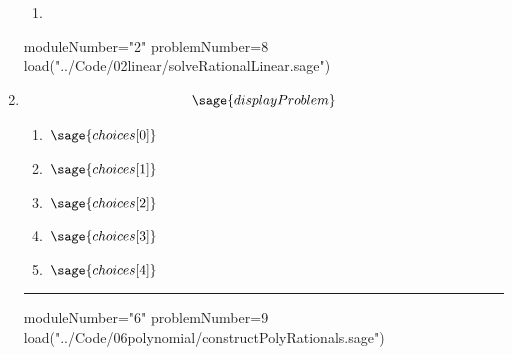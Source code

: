 \documentclass[14pt]{extbook}
\newcommand{\litem}[1]{\item#1\hspace*{-1cm}\rule{\textwidth}{0.4pt}}
\begin{document}
\begin{enumerate}
{\begin{enumerate}[label=\Alph*.]
        \item {}
\end{enumerate}
}
\begin{sagesilent}
moduleNumber="2"
problemNumber=8
load("../Code/02linear/solveRationalLinear.sage")
\end{sagesilent}

\litem{ 

   \[ \sage{displayProblem} \]

  	\begin{enumerate}[label=\Alph*.]
    \item \( \sage{choices[0]} \)
    \item \( \sage{choices[1]} \)
    \item \( \sage{choices[2]} \)
    \item \( \sage{choices[3]} \)
    \item \( \sage{choices[4]} \)
  	\end{enumerate}
  }
\begin{sagesilent}
moduleNumber="6"
problemNumber=9
load("../Code/06polynomial/constructPolyRationals.sage")
\end{sagesilent}


\end{enumerate}
\end{document}
